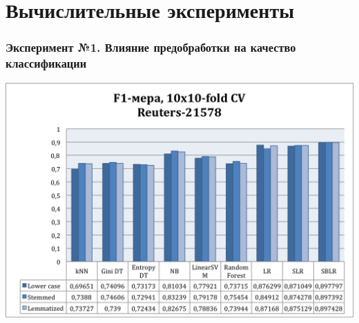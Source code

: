 \documentclass{beamer}
\begin{document}
\section{Вычислительные эксперименты}
\begin{frame}
\frametitle{Эксперимент №1. Влияние предобработки на качество классификации}
\begin{center}
    \includegraphics[width=\linewidth,height=0.7\textheight,align=\center,keepaspectratio, trim=4 4 4 4, clip]{reuters-preprocessing.png}
\end{center}
\end{frame}
\end{document}
